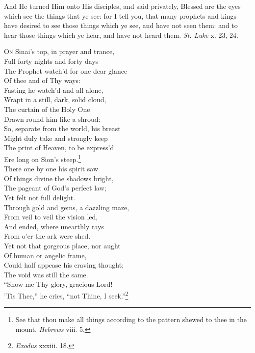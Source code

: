 
And He turned Him onto His disciples, and said privately, Blessed are the eyes which see the things that ye see: for I tell you, that many prophets and kings have desired to see those things which ye see, and have not seen them: and to hear those things which ye hear, and have not heard them. \emph{St. Luke} x. 23, 24.

\textsc{On} Sinai’s top, in prayer and trance, \\
 Full forty nights and forty days \\
 The Prophet watch’d for one dear glance \\
 Of thee and of Thy ways: \\
  Fasting he watch’d and all alone, \\
 Wrapt in a still, dark, solid cloud, \\
 The curtain of the Holy One \\
 Drawn round him like a shroud: \\
  So, separate from the world, his breast \\
 Might duly take and strongly keep \\
 The print of Heaven, to be express’d \\
 Ere long on Sion’s steep.\footnote{See that thou make all things according to the pattern shewed to thee in the mount. \emph{Hebrews} viii. 5.} \\
  There one by one his spirit saw \\
 Of things divine the shadows bright, \\
 The pageant of God’s perfect law; \\
 Yet felt not full delight. \\
  Through gold and gems, a dazzling maze, \\
 From veil to veil the vision led, \\
 And ended, where unearthly rays \\
 From o’er the ark were shed. \\
  Yet not that gorgeous place, nor aught \\
 Of human or angelic frame, \\
 Could half appease his craving thought; \\
 The void was still the same. \\
  “Show me Thy glory, gracious Lord! \\
 ’Tis Thee,” he cries, “not Thine, I seek.”\footnote{\emph{Exodus} xxxiii. 18.} \\
